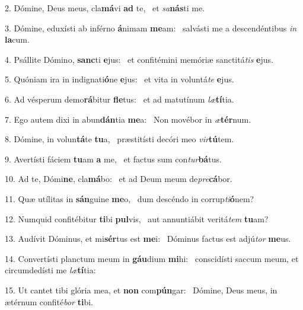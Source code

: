 2. Dómine, Deus meus, cla\textbf{má}vi \textbf{ad} te, \ast\  et \textit{sa}\textbf{nás}ti me.\

3. Dómine, eduxísti ab inférno \textbf{á}nimam \textbf{me}am: \ast\  salvásti me a descendéntibus \textit{in} \textbf{la}cum.\

4. Psállite Dómino, \textbf{sanc}ti \textbf{e}jus: \ast\  et confitémini memóriæ sanctitá\textit{tis} \textbf{e}jus.\

5. Quóniam ira in indignati\textbf{ó}ne \textbf{e}jus: \ast\  et vita in voluntá\textit{te} \textbf{e}jus.\

6. Ad vésperum demo\textbf{rá}bitur \textbf{fle}tus: \ast\  et ad matutínum \textit{læ}\textbf{tí}tia.\

7. Ego autem dixi in abun\textbf{dán}tia \textbf{me}a: \ast\  Non movébor in \textit{æ}\textbf{tér}num.\

8. Dómine, in volun\textbf{tá}te \textbf{tu}a, \ast\  præstitísti decóri meo \textit{vir}\textbf{tú}tem.\

9. Avertísti fáciem \textbf{tu}am \textbf{a} me, \ast\  et factus sum con\textit{tur}\textbf{bá}tus.\

10. Ad te, Dómi\textbf{ne}, cla\textbf{má}bo: \ast\  et ad Deum meum de\textit{pre}\textbf{cá}bor.\

11. Quæ utílitas in \textbf{sán}guine \textbf{me}o, \ast\  dum descéndo in corrup\textit{ti}\textbf{ó}nem?\

12. Numquid confitébitur \textbf{ti}bi \textbf{pul}vis, \ast\  aut annuntiábit veritá\textit{tem} \textbf{tu}am?\

13. Audívit Dóminus, et mi\textbf{sér}tus est \textbf{me}i: \ast\  Dóminus factus est adjú\textit{tor} \textbf{me}us.\

14. Convertísti planctum meum in \textbf{gáu}dium \textbf{mi}hi: \ast\  conscidísti saccum meum, et circumdedísti me \textit{læ}\textbf{tí}tia:\

15. Ut cantet tibi glória mea, et \textbf{non} com\textbf{pún}gar: \ast\  Dómine, Deus meus, in ætérnum confité\textit{bor} \textbf{ti}bi.\

